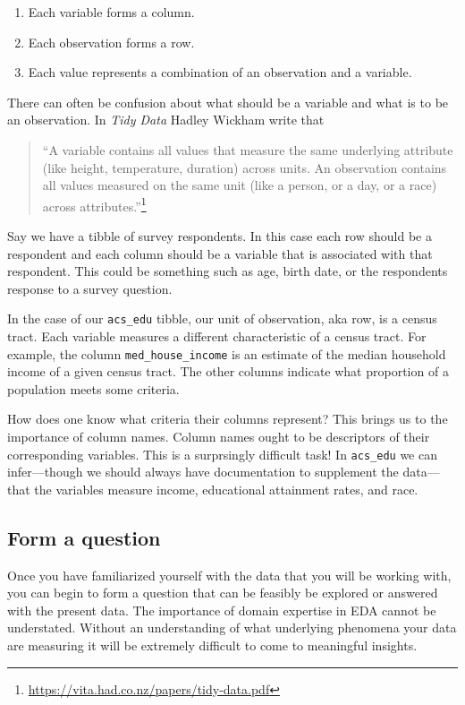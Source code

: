 \documentclass[
]{book}
\providecommand{\tightlist}{%
  \setlength{\itemsep}{0pt}\setlength{\parskip}{0pt}}
\begin{document}
\begin{enumerate}
\def\labelenumi{\arabic{enumi}.}
\tightlist
\item
  Each variable forms a column.
\item
  Each observation forms a row.
\item
  Each value represents a combination of an observation and a variable.
\end{enumerate}

There can often be confusion about what should be a variable and what is to be an observation. In \emph{Tidy Data} Hadley Wickham write that

\begin{quote}
``A variable contains all values that measure the same underlying attribute (like height, temperature, duration) across units. An observation contains all values measured on the same unit (like a person, or a day, or a race) across attributes.''\footnote{\url{https://vita.had.co.nz/papers/tidy-data.pdf}}
\end{quote}

Say we have a tibble of survey respondents. In this case each row should be a respondent and each column should be a variable that is associated with that respondent. This could be something such as age, birth date, or the respondents response to a survey question.

In the case of our \texttt{acs\_edu} tibble, our unit of observation, aka row, is a census tract. Each variable measures a different characteristic of a census tract. For example, the column \texttt{med\_house\_income} is an estimate of the median household income of a given census tract. The other columns indicate what proportion of a population meets some criteria.

How does one know what criteria their columns represent? This brings us to the importance of column names. Column names ought to be descriptors of their corresponding variables. This is a surprsingly difficult task! In \texttt{acs\_edu} we can infer---though we should always have documentation to supplement the data---that the variables measure income, educational attainment rates, and race.

\hypertarget{form-a-question}{%
\subsection{Form a question}\label{form-a-question}}

Once you have familiarized yourself with the data that you will be working with, you can begin to form a question that can be feasibly be explored or answered with the present data. The importance of domain expertise in EDA cannot be understated. Without an understanding of what underlying phenomena your data are measuring it will be extremely difficult to come to meaningful insights.
\end{document}

